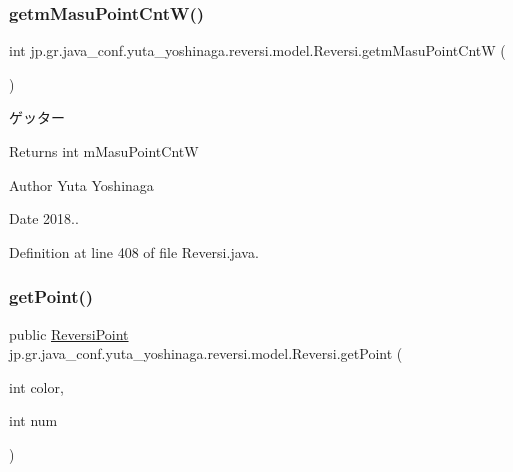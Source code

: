 \subsubsection{\texorpdfstring{getm\+Masu\+Point\+Cnt\+W()}{getmMasuPointCntW()}}
{\footnotesize\ttfamily int jp.\+gr.\+java\+\_\+conf.\+yuta\+\_\+yoshinaga.\+reversi.\+model.\+Reversi.\+getm\+Masu\+Point\+CntW (\begin{DoxyParamCaption}{ }\end{DoxyParamCaption})}



ゲッター 

\begin{DoxyReturn}{Returns}
int m\+Masu\+Point\+CntW 
\end{DoxyReturn}
\begin{DoxyAuthor}{Author}
Yuta Yoshinaga 
\end{DoxyAuthor}
\begin{DoxyDate}{Date}
2018.. 
\end{DoxyDate}


Definition at line 408 of file Reversi.\+java.

\mbox{\label{classjp_1_1gr_1_1java__conf_1_1yuta__yoshinaga_1_1reversi_1_1model_1_1_reversi_ab180757b310c3a72cf159043ba0dc09e}} 
\subsubsection{\texorpdfstring{get\+Point()}{getPoint()}}
{\footnotesize\ttfamily public \hyperlink{classjp_1_1gr_1_1java__conf_1_1yuta__yoshinaga_1_1reversi_1_1model_1_1_reversi_point}{Reversi\+Point} jp.\+gr.\+java\+\_\+conf.\+yuta\+\_\+yoshinaga.\+reversi.\+model.\+Reversi.\+get\+Point (\begin{DoxyParamCaption}\item[{int}]{color,  }\item[{int}]{num }\end{DoxyParamCaption})}



